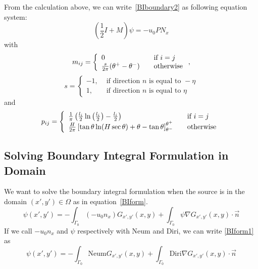\documentclass[a4paper,12pt]{article}
\newcommand{\integ}[3]{%
\ensuremath{\displaystyle{\int^{#2}_{#1} #3}}}
\begin{document}
From the calculation above, we can write~\eqref{BIboundary2} as following equation system:
\begin{equation}\label{SPL}
 \left( \frac{1}{2} I+M \right) \psi= -u_0 P N_x 
\end{equation}
with 
\[  m_{ij}= \left\{
  \begin{array}{l l}
    0 & \quad \text{if $i=j$ }\\
    \frac{s}{2\pi}(\theta^+-\theta^-) & \quad \text{otherwise}
  \end{array} \right.,\]
   \[
 s=\left\{ \begin{array}{ll}
    -1, & \text{ if direction } n \text{ is equal to }-\eta\\
    1, & \text{ if direction } n \text{ is equal to } \eta
   \end{array}\right.
\]
  and
  \[  p_{ij}= \left\{
  \begin{array}{l l}
     \frac{1}{\pi} \left( \frac{l_i}{2}\ln \left( \frac{l_i}{2} \right)-\frac{l_i}{2} \right) & \quad \text{if $i=j$ }\\
    \frac{H}{2\pi}\left [ \tan \theta \ln (H\sec\theta)+\theta-\tan\theta \right ]_{\theta^-}^{\theta^+} & \quad \text{otherwise}
  \end{array} \right.\]

  
\subsection{Solving Boundary Integral Formulation in Domain}

We want to solve the boundary integral formulation when the source is in the domain $(x',y')\in \Omega$ as in equation~\eqref{BIform}. 
\begin{equation}
 \psi(x',y')=-\integ{\Gamma_0}{}{(-u_0 n_x)G_{x',y'}(x,y)} + \integ{\Gamma_0}{}{\psi\nabla G_{x',y'}(x,y)\cdot \vec{n}} \label{BIform1}
\end{equation}
If we call $-u_0 n_x$ and $\psi$ respectively with Neum and Diri, we can write \ref{BIform1} as
\begin{equation}
 \psi(x',y')=-\integ{\Gamma_0}{}{\text{Neum}G_{x',y'}(x,y)} + \integ{\Gamma_0}{}{\text{Diri}\nabla G_{x',y'}(x,y)\cdot \vec{n}}
\end{equation}
\end{document}
